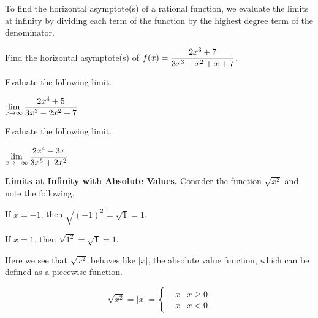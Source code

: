 \documentclass[12pt]{article}
\begin{document}
To find the horizontal asymptote(s) of a rational function, we evaluate the limits at infinity by dividing each term of the function by the highest degree term of the denominator.

\Example Find the horizontal asymptote(s) of $f(x)=\displaystyle\frac{2x^3+7}{3x^3-x^2+x+7}$.

\newpage 

\Example Evaluate the following limit.

\vspace{5mm}

\hspace{10mm} $\displaystyle\lim_{x\to\infty}\frac{2x^4+5}{3x^3-2x^2+7}$

\vspace{50mm}

\Example Evaluate the following limit.

\vspace{5mm}

\hspace{10mm} $\displaystyle\lim_{x\to -\infty}\frac{2x^4-3x}{3x^5+2x^2}$

\vspace{50mm}

\textbf{Limits at Infinity with Absolute Values.} Consider the function $\sqrt{x^2}$ and note the following.
\begin{center}
If $x=-1$, then $\sqrt{(-1)^2}=\sqrt{1}=1$.

\vspace{3mm}

If $x=1$, then $\sqrt{1^2}=\sqrt{1}=1$.
\end{center}

Here we see that $\sqrt{x^2}$ behaves like $\vert x \vert$, the absolute value function, which can be defined as a piecewise function.

$$ \sqrt{x^2} = \vert x \vert = \begin{cases} +x & x \geqslant 0 \\ -x & x < 0 \end{cases} $$

\newpage

\begin{center}

\vspace{3mm}

        \end{center}
        
\end{document}
